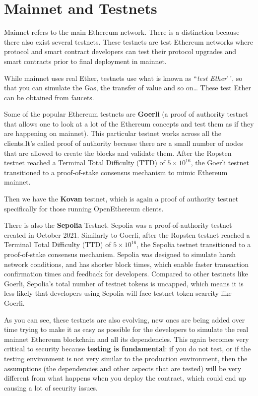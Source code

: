 \section{Mainnet and Testnets}\label{mainnet-and-testnets}

Mainnet refers to the main Ethereum network. There is a distinction
because there also exist several testnets. These testnets are test
Ethereum networks where protocol and smart contract developers can test
their protocol upgrades and smart contracts prior to final deployment in
mainnet.

While mainnet uses real Ether, testnets use what is known as
``\emph{test Ether}'\,', so that you can simulate the Gas, the transfer
of value and so on\ldots{} These test Ether can be obtained from
faucets.

Some of the popular Ethereum testnets are \textbf{Goerli} (a proof of
authority testnet that allows one to look at a lot of the Ethereum
concepts and test them as if they are happening on mainnet). This
particular testnet works across all the clients.It's called proof of
authority because there are a small number of nodes that are allowed to
create the blocks and validate them. After the Ropsten testnet reached a
Terminal Total Difficulty (TTD) of $5\times 10^{16}$, the Goerli
testnet transitioned to a proof-of-stake consensus mechanism to mimic
Ethereum mainnet.

Then we have the \textbf{Kovan} testnet, which is again a proof of
authority testnet specifically for those running OpenEthereum clients.

There is also the \textbf{Sepolia} Testnet. Sepolia was a
proof-of-authority testnet created in October 2021. Similarly to Goerli,
after the Ropsten testnet reached a Terminal Total Difficulty (TTD) of
$5\times 10^{16}$, the Sepolia testnet transitioned to a
proof-of-stake consensus mechanism. Sepolia was designed to simulate
harsh network conditions, and has shorter block times, which enable
faster transaction confirmation times and feedback for developers.
Compared to other testnets like Goerli, Sepolia's total number of
testnet tokens is uncapped, which means it is less likely that
developers using Sepolia will face testnet token scarcity like Goerli.

As you can see, these testnets are also evolving, new ones are being
added over time trying to make it as easy as possible for the developers
to simulate the real mainnet Ethereum blockchain and all its
dependencies. This again becomes very critical to security because
\textbf{testing is fundamental}: if you do not test, or if the testing
environment is not very similar to the production environment, then the
assumptions (the dependencies and other aspects that are tested) will be
very different from what happens when you deploy the contract, which
could end up causing a lot of security issues.

